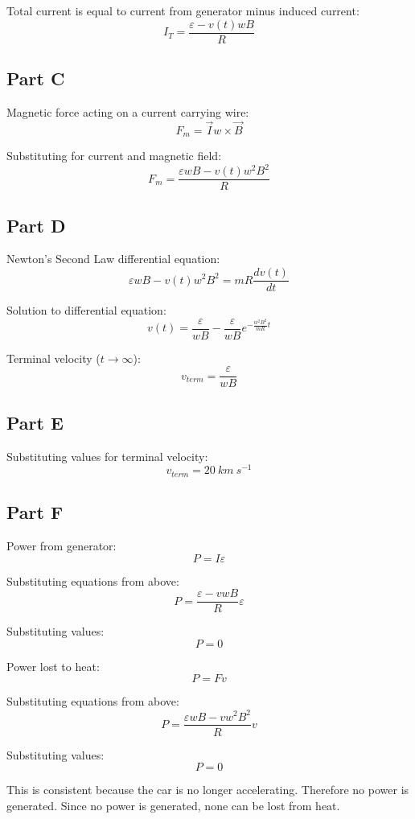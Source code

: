 \documentclass{article}
\begin{document}
Total current is equal to current from generator minus induced current:
$$ I_{T} = \frac{\varepsilon - v(t) w B}{R} $$

\subsection*{Part C}

Magnetic force acting on a current carrying wire:
$$ F_m = \vec{I} w \times \vec{B} $$

Substituting for current and magnetic field:
$$ F_m = \frac{\varepsilon w B - v(t) w^2 B^2}{R} $$

\subsection*{Part D}

Newton's Second Law differential equation:
$$ \varepsilon w B - v(t) w^2 B^2 = m R \frac{d v(t)}{dt} $$

Solution to differential equation:
$$ v(t) = \frac{\varepsilon}{w B} - \frac{\varepsilon}{w B} e^{-\frac{w^2 B^2}{m
R} t} $$

Terminal velocity ($t \rightarrow \infty$):
$$ v_{term} = \frac{\varepsilon}{w B} $$

\subsection*{Part E}

Substituting values for terminal velocity:
$$ v_{term} = 20\ \si{km\ s^{-1}} $$

\subsection*{Part F}

Power from generator:
$$ P = I \varepsilon $$

Substituting equations from above:
$$ P = \frac{\varepsilon - v w B}{R} \varepsilon $$

Substituting values:
$$ P = 0 $$

Power lost to heat:
$$ P = F v $$

Substituting equations from above:
$$ P = \frac{\varepsilon w B - v w^2 B^2}{R} v $$

Substituting values:
$$ P = 0 $$

This is consistent because the car is no longer accelerating. Therefore no
power is generated. Since no power is generated, none can be lost from heat.
\end{document}
